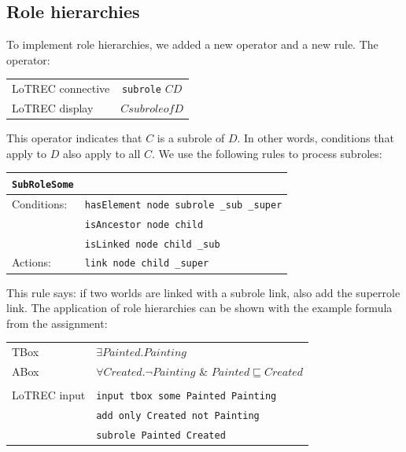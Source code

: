 \documentclass[11pt]{article} %
\begin{document}
\subsection{Role hierarchies}

To implement role hierarchies, we added a new operator and a new rule. The operator:

\begin{table}[h]
\begin{center}
\begin{tabular}{l c}
LoTREC connective & \texttt{subrole} $C D$ \\
LoTREC display & $C subrole of D$ \\
\end{tabular}
\end{center}
\end{table}

This operator indicates that $C$ is a subrole of $D$. In other words, conditions that apply to $D$ also apply to all $C$. We use the following rules to process subroles:

\begin{table}[h]
\begin{center}
\begin{tabular}{l l}
\texttt{SubRoleSome} & \\
\hline
Conditions: & \texttt{hasElement node subrole \_sub \_super} \\
 & \texttt{isAncestor node child} \\
 & \texttt{isLinked node child \_sub} \\
Actions: & \texttt{link node child \_super} \\
\hline
\end{tabular}
\end{center}
\end{table}

This rule says: if two worlds are linked with a subrole link, also add the superrole link. The application of role hierarchies can be shown with the example formula from the assignment:

\begin{table}[h]
\begin{center}
\begin{tabular}{l l}
TBox & $\exists{}Painted.Painting$ \\
ABox & $\forall{}Created.\neg{}Painting$ \& $Painted\sqsubseteq{}Created$ \\
\\
LoTREC input & \texttt{input tbox some Painted Painting} \\
 & \texttt{add only Created not Painting}\\
 & \texttt{subrole Painted Created} \\
\end{tabular}
\end{center}
\end{table}
\end{document}
